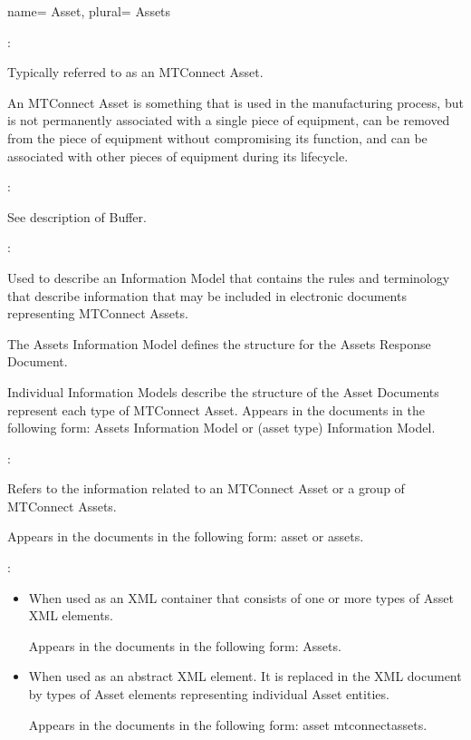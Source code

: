 {
  name= {Asset},
  plural= {Assets}
}
{
  :

  Typically referred to as an MTConnect Asset.

  An MTConnect Asset is something that is used in the manufacturing process, but is not permanently associated with a single piece of equipment, can be removed from the piece of equipment without compromising its function, and can be associated with other pieces of equipment during its lifecycle.

  :

  See description of Buffer.

  :

  Used to describe an Information Model that contains the rules and terminology that describe information that may be included in electronic documents representing MTConnect Assets.

  The Assets Information Model defines the structure for the Assets Response Document.

  Individual Information Models describe the structure of the Asset Documents represent each type of MTConnect Asset. Appears in the documents in the following form: Assets Information Model or (asset type) Information Model.
  
  :

  Refers to the information related to an MTConnect Asset or a group of MTConnect Assets.

  Appears in the documents in the following form: \gls{asset} or \glspl{asset}.

  :

  \begin{itemize}
      \item When used as an XML container that consists of one or more types of Asset XML elements.
      
      Appears in the documents in the following form: Assets.
      \item When used as an abstract XML element. It is replaced in the XML document by types of Asset elements representing individual Asset entities.
      
      Appears in the documents in the following form: \gls{asset mtconnectassets}.
  \end{itemize}

}
